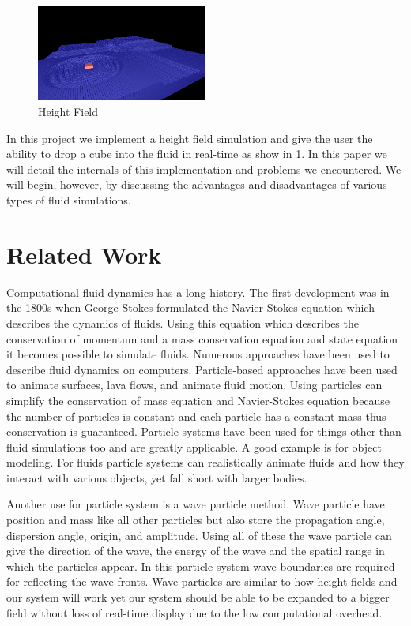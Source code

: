 \documentclass[12pt,notitlepage]{article}
\begin{document}
\begin{figure}[H]
    \caption{Height Field}
    \label{fig:field}
    \centering
    \includegraphics[width=0.5\textwidth]{../www/images/field}
\end{figure}

In this project we implement a height field simulation and give the user the 
ability to drop a cube into the fluid in real-time as show in \ref{fig:field}.  
In this paper we will detail the internals of this implementation and problems 
we encountered.  We will begin, however, by discussing the advantages and 
disadvantages of various types of fluid simulations.

\section{Related Work}

Computational fluid dynamics has a long history. The first development was in 
the 1800s when George Stokes formulated the Navier-Stokes equation which 
describes the dynamics of fluids. Using this equation which describes the 
conservation of momentum and a mass conservation equation and state equation it 
becomes possible to simulate fluids. \cite{particle}
Numerous approaches have been used to describe fluid dynamics on computers. 
Particle-based approaches have been used to animate surfaces, lava flows, and 
animate fluid motion. \cite{smooth}\cite{dynamic}\cite{implicit} Using 
particles can simplify the conservation of mass equation and Navier-Stokes 
equation because the number of particles is constant and each particle has a 
constant mass thus conservation is guaranteed.
Particle systems have been used for things other than fluid simulations too and 
are greatly applicable. A good example is for object modeling. \cite{oriented} 
For fluids 
particle systems can realistically animate fluids and how they interact with 
various objects, yet fall short with larger bodies. \cite{particle}

Another use for particle system is a wave particle method. Wave particle have 
position and mass like all other particles but also store the propagation 
angle, dispersion angle, origin, and amplitude. Using all of these the wave 
particle can give the direction of the wave, the energy of the wave and the 
spatial range in which the particles appear. In this particle system wave 
boundaries are required for reflecting the wave fronts. \cite{realtime} Wave 
particles are similar to how height fields and our system will work yet our 
system should be able to be expanded to a bigger field without loss of 
real-time display due to the low computational overhead.
\end{document}
